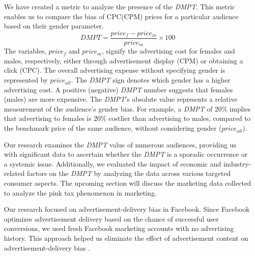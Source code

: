 \documentclass[twocolumn]{bmcart}\usepackage{lineno}
\begin{document}
We have created a metric to analyze the presence of the \emph{DMPT}. This metric enables us to compare the bias of CPC(CPM) prices for a particular audience based on their gender parameter.
\color{blue}
\[DMPT=\frac{price_f-price_m}{price_{m}}\times 100 \]
\color{black}
The variables, \(price_f\) and \(price_m\), signify the advertising cost for females and males, respectively, either through advertisement display (CPM) or obtaining a click (CPC). The overall advertising expense without specifying gender is represented by \(price_{all}\). The \emph{DMPT} sign denotes which gender has a higher advertising cost. A positive (negative) \emph{DMPT} number suggests that females (males) are more expensive. The \emph{DMPT}'s absolute value represents a relative measurement of the audience's gender bias. For example, a \emph{DMPT} of 20\% implies that advertising to females is 20\% costlier than advertising to males, compared to the benchmark price of the same audience, without considering gender (\(price_{all}\)).

Our research examines the \emph{DMPT} value of numerous audiences, providing us with significant data to ascertain whether the \emph{DMPT} is a sporadic occurrence or a systemic issue. Additionally, we evaluated the impact of economic and industry-related factors on the \emph{DMPT} by analyzing the data across various targeted consumer aspects. The upcoming section will discuss the marketing data collected to analyze the pink tax phenomenon in marketing.

\color{blue}
Our research focused on advertisement-delivery bias in Facebook. Since Facebook optimizes advertisement delivery based on the chance of successful user conversions, we used fresh Facebook marketing accounts with no advertising history. This approach helped us eliminate the effect of advertisement content on advertisement-delivery bias \cite{lambrecht2019algorithmic,ali2019discrimination}.
\color{black}
\end{document}
